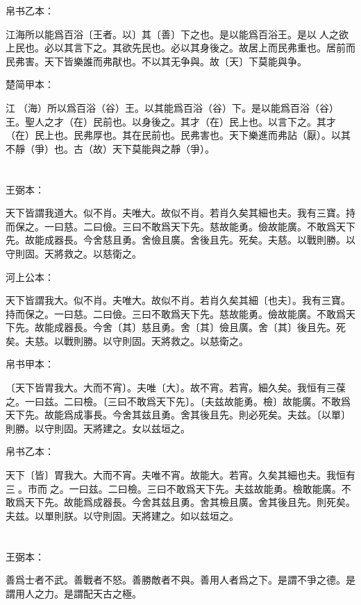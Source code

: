 \documentclass[a5paper]{ctexbook}
\begin{document}
    帛书乙本：

    江海所以能爲百浴〔王者。以〕其〔善〕下之也。是以能爲百浴王。是以𦔻人之欲上民也。必以其言下之。其欲先民也。必以其身後之。故居上而民弗重也。居前而民弗害。天下皆樂誰而弗猒也。不以其无争與。故〔天〕下莫能與争。

    楚简甲本：

    江𣳠（海）所以爲百浴（谷）王。以其能爲百浴（谷）下。是以能爲百浴（谷）王。聖人之才（在）民前也。以身後之。其才（在）民上也。以言下之。其才（在）民上也。民弗厚也。其在民前也。民弗害也。天下樂進而弗詀（厭）。以其不靜（爭）也。古（故）天下莫能與之靜（爭）。

    \chapter{}
    王弼本：

    天下皆謂我道大。似不肖。夫唯大。故似不肖。若肖久矣其細也夫。我有三寶。持而保之。一曰慈。二曰儉。三曰不敢爲天下先。慈故能勇。儉故能廣。不敢爲天下先。故能成器長。今舍慈且勇。舍儉且廣。舍後且先。死矣。夫慈。以戰則勝。以守則固。天將救之。以慈衛之。

    河上公本：

    天下皆謂我大。似不肖。夫唯大。故似不肖。若肖久矣其細〔也夫〕。我有三寶。持而保之。一曰慈。二曰儉。三曰不敢爲天下先。慈故能勇。儉故能廣。不敢爲天下先。故能成器長。今舍〔其〕慈且勇。舍〔其〕儉且廣。舍〔其〕後且先。死矣。夫慈。以戰則勝。以守則固。天將救之。以慈衛之。

    帛书甲本：

    〔天下皆胃我大。大而不宵〕。夫唯〔大〕。故不宵。若宵。細久矣。我恒有三葆之。一曰兹。二曰檢。〔三曰不敢爲天下先〕。〔夫兹故能勇。檢〕故能廣。不敢爲天下先。故能爲成事長。今舍其兹且勇。舍其後且先。則必死矣。夫兹。〔以單〕則勝。以守則固。天將建之。女以兹垣之。

    帛书乙本：

    天下〔皆〕胃我大。大而不宵。夫唯不宵。故能大。若宵。久矣其細也夫。我恒有三𤥯。市而𤥯之。一曰兹。二曰檢。三曰不敢爲天下先。夫兹故能勇。檢敢能廣。不敢爲天下先。故能爲成器長。今舍其兹且勇。舍其檢且廣。舍其後且先。則死矣。夫兹。以單則朕。以守則固。天將建之。如以兹垣之。

    \chapter{}
    王弼本：

    善爲士者不武。善戰者不怒。善勝敵者不與。善用人者爲之下。是謂不爭之德。是謂用人之力。是謂配天古之極。
\end{document}

